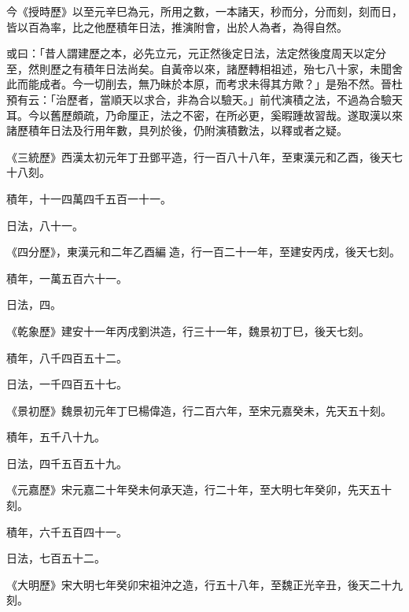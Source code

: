 \begin{pinyinscope}
 今《授時歷》以至元辛巳為元，所用之數，一本諸天，秒而分，分而刻，刻而日，皆以百為率，比之他歷積年日法，推演附會，出於人為者，為得自然。



 或曰：「昔人謂建歷之本，必先立元，元正然後定日法，法定然後度周天以定分至，然則歷之有積年日法尚矣。自黃帝以來，諸歷轉相祖述，殆七八十家，未聞舍此而能成者。今一切削去，無乃昧於本原，而考求未得其方歟？」是殆不然。晉杜預有云：「治歷者，當順天以求合，非為合以驗天。」前代演積之法，不過為合驗天耳。今以舊歷頗疏，乃命厘正，法之不密，在所必更，奚暇踵故習哉。遂取漢以來諸歷積年日法及行用年數，具列於後，仍附演積數法，以釋或者之疑。



 《三統歷》西漢太初元年丁丑鄧平造，行一百八十八年，至東漢元和乙酉，後天七十八刻。



 積年，十一四萬四千五百一十一。



 日法，八十一。



 《四分歷》，東漢元和二年乙酉編造，行一百二十一年，至建安丙戌，後天七刻。



 積年，一萬五百六十一。



 日法，四。



 《乾象歷》建安十一年丙戌劉洪造，行三十一年，魏景初丁巳，後天七刻。



 積年，八千四百五十二。



 日法，一千四百五十七。



 《景初歷》魏景初元年丁巳楊偉造，行二百六年，至宋元嘉癸未，先天五十刻。



 積年，五千八十九。



 日法，四千五百五十九。



 《元嘉歷》宋元嘉二十年癸未何承天造，行二十年，至大明七年癸卯，先天五十刻。



 積年，六千五百四十一。



 日法，七百五十二。



 《大明歷》宋大明七年癸卯宋祖沖之造，行五十八年，至魏正光辛丑，後天二十九刻。




\end{pinyinscope}
